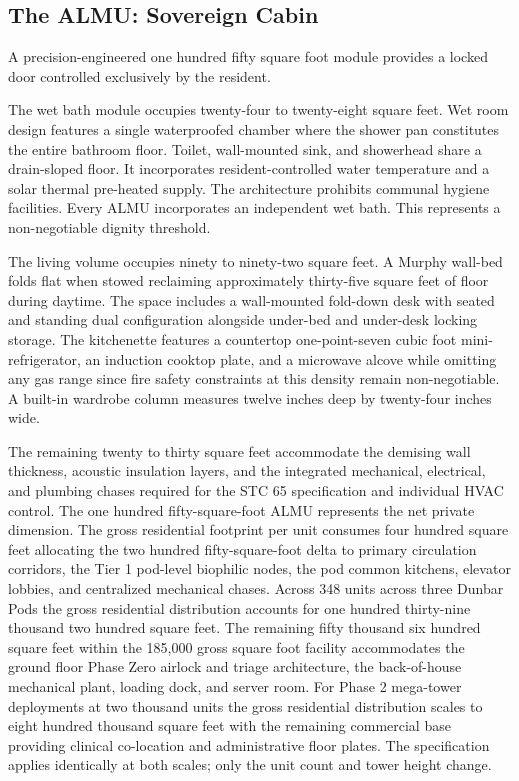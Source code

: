 \documentclass[12pt, letterpaper]{article}
\begin{document}
\subsection{The ALMU: Sovereign Cabin}

A precision-engineered one hundred fifty square foot module provides a locked door controlled exclusively by the resident.

The wet bath module occupies twenty-four to twenty-eight square feet. Wet room design features a single waterproofed chamber where the shower pan constitutes the entire bathroom floor. Toilet, wall-mounted sink, and showerhead share a drain-sloped floor. It incorporates resident-controlled water temperature and a solar thermal pre-heated supply. The architecture prohibits communal hygiene facilities. Every ALMU incorporates an independent wet bath. This represents a non-negotiable dignity threshold.

The living volume occupies ninety to ninety-two square feet. A Murphy wall-bed folds flat when stowed reclaiming approximately thirty-five square feet of floor during daytime. The space includes a wall-mounted fold-down desk with seated and standing dual configuration alongside under-bed and under-desk locking storage. The kitchenette features a countertop one-point-seven cubic foot mini-refrigerator, an induction cooktop plate, and a microwave alcove while omitting any gas range since fire safety constraints at this density remain non-negotiable. A built-in wardrobe column measures twelve inches deep by twenty-four inches wide.

The remaining twenty to thirty square feet accommodate the demising wall thickness, acoustic insulation layers, and the integrated mechanical, electrical, and plumbing chases required for the STC 65 specification and individual HVAC control. The one hundred fifty-square-foot ALMU represents the net private dimension. The gross residential footprint per unit consumes four hundred square feet allocating the two hundred fifty-square-foot delta to primary circulation corridors, the Tier 1 pod-level biophilic nodes, the pod common kitchens, elevator lobbies, and centralized mechanical chases. Across 348 units across three Dunbar Pods the gross residential distribution accounts for one hundred thirty-nine thousand two hundred square feet. The remaining fifty thousand six hundred square feet within the 185,000 gross square foot facility accommodates the ground floor Phase Zero airlock and triage architecture, the back-of-house mechanical plant, loading dock, and server room. For Phase 2 mega-tower deployments at two thousand units the gross residential distribution scales to eight hundred thousand square feet with the remaining commercial base providing clinical co-location and administrative floor plates. The specification applies identically at both scales; only the unit count and tower height change.
\end{document}
